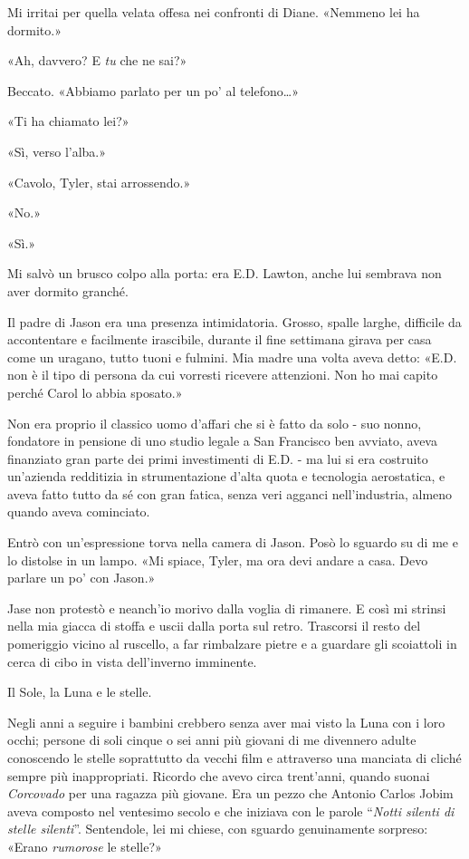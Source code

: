 Mi irritai per quella velata offesa nei confronti di Diane. «Nemmeno lei
ha dormito.»

«Ah, davvero? E \emph{tu} che ne sai?»

Beccato. «Abbiamo parlato per un po' al telefono\ldots»

«Ti ha chiamato lei?»

«Sì, verso l'alba.»

«Cavolo, Tyler, stai arrossendo.»

«No.»

«Sì.»

Mi salvò un brusco colpo alla porta: era E.D. Lawton, anche lui sembrava
non aver dormito granché.

Il padre di Jason era una presenza intimidatoria. Grosso, spalle larghe,
difficile da accontentare e facilmente irascibile, durante il fine
settimana girava per casa come un uragano, tutto tuoni e fulmini. Mia
madre una volta aveva detto: «E.D. non è il tipo di persona da cui
vorresti ricevere attenzioni. Non ho mai capito perché Carol lo abbia
sposato.»

Non era proprio il classico uomo d'affari che si è fatto da solo - suo
nonno, fondatore in pensione di uno studio legale a San Francisco ben
avviato, aveva finanziato gran parte dei primi investimenti di E.D. - ma
lui si era costruito un'azienda redditizia in strumentazione d'alta
quota e tecnologia aerostatica, e aveva fatto tutto da sé con gran
fatica, senza veri agganci nell'industria, almeno quando aveva
cominciato.

Entrò con un'espressione torva nella camera di Jason. Posò lo sguardo su
di me e lo distolse in un lampo. «Mi spiace, Tyler, ma ora devi andare a
casa. Devo parlare un po' con Jason.»

Jase non protestò e neanch'io morivo dalla voglia di rimanere. E così mi
strinsi nella mia giacca di stoffa e uscii dalla porta sul retro.
Trascorsi il resto del pomeriggio vicino al ruscello, a far rimbalzare
pietre e a guardare gli scoiattoli in cerca di cibo in vista
dell'inverno imminente.

\separatorefiori

Il Sole, la Luna e le stelle.

Negli anni a seguire i bambini crebbero senza aver mai visto la Luna con
i loro occhi; persone di soli cinque o sei anni più giovani di me
divennero adulte conoscendo le stelle soprattutto da vecchi film e
attraverso una manciata di cliché sempre più inappropriati. Ricordo che
avevo circa trent'anni, quando suonai \emph{Corcovado} per una ragazza
più giovane. Era un pezzo che Antonio Carlos Jobim aveva composto nel
ventesimo secolo e che iniziava con le parole ``\emph{Notti silenti di
	stelle silenti}''. Sentendole, lei mi chiese, con sguardo genuinamente
sorpreso: «Erano \emph{rumorose} le stelle?»

